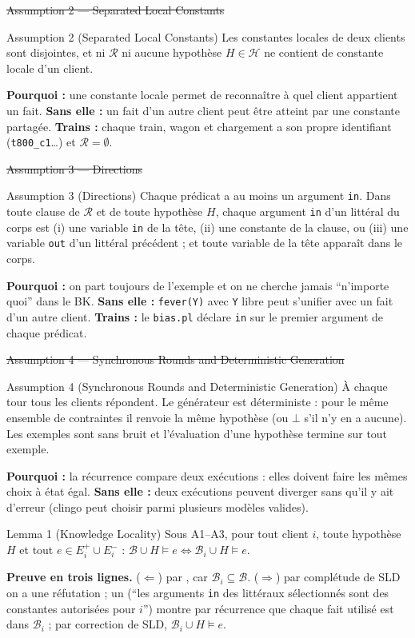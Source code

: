 \documentclass[10pt]{article}
\begin{document}
\st{Assumption 2 --- Separated Local Constants}
\begin{enonce}{Assumption 2 (Separated Local Constants)}
Les constantes locales de deux clients sont disjointes, et ni $\mathcal{R}$ ni aucune hypothèse $H\in\mathcal{H}$ ne contient de constante locale d'un client.
\end{enonce}
\textbf{Pourquoi :} une constante locale permet de reconnaître à quel client appartient un fait. \textbf{Sans elle :} un fait d'un autre client peut être atteint par une constante partagée.
\textbf{Trains :} chaque train, wagon et chargement a son propre identifiant (\texttt{t800\_c1}\ldots) et $\mathcal{R}=\emptyset$.

\st{Assumption 3 --- Directions}
\begin{enonce}{Assumption 3 (Directions)}
Chaque prédicat a au moins un argument \texttt{in}. Dans toute clause de $\mathcal{R}$ et de toute hypothèse $H$, chaque argument \texttt{in}
d'un littéral du corps est (i) une variable \texttt{in} de la tête, (ii) une constante de la clause, ou (iii) une variable \texttt{out} d'un
littéral précédent ; et toute variable de la tête apparaît dans le corps.
\end{enonce}
\textbf{Pourquoi :} on part toujours de l'exemple et on ne cherche jamais ``n'importe quoi'' dans le BK.
\textbf{Sans elle :} \texttt{fever(Y)} avec \texttt{Y} libre peut s'unifier avec un fait d'un autre client.
\textbf{Trains :} le \texttt{bias.pl} déclare \texttt{in} sur le premier argument de chaque prédicat.

\st{Assumption 4 --- Synchronous Rounds and Deterministic Generation}
\begin{enonce}{Assumption 4 (Synchronous Rounds and Deterministic Generation)}
À chaque tour tous les clients répondent. Le générateur est déterministe : pour le même ensemble de contraintes il renvoie la même hypothèse
(ou $\bot$ s'il n'y en a aucune). Les exemples sont sans bruit et l'évaluation d'une hypothèse termine sur tout exemple.
\end{enonce}
\textbf{Pourquoi :} la récurrence compare deux exécutions : elles doivent faire les mêmes choix à état égal.
\textbf{Sans elle :} deux exécutions peuvent diverger sans qu'il y ait d'erreur (clingo peut choisir parmi plusieurs modèles valides).

\begin{enonce}{Lemma 1 (Knowledge Locality)}
Sous A1--A3, pour tout client $i$, toute hypothèse $H$ et tout $e\in E_i^+\cup E_i^-$ :
$\mathcal{B}\cup H\models e\iff\mathcal{B}_i\cup H\models e$.
\end{enonce}
\textbf{Preuve en trois lignes.} ($\Leftarrow$) par , car $\mathcal{B}_i\subseteq\mathcal{B}$.
($\Rightarrow$) par complétude de SLD on a une réfutation ; un  (``les arguments \texttt{in} des littéraux sélectionnés sont des constantes autorisées pour $i$'')
montre par récurrence que chaque fait utilisé est dans $\mathcal{B}_i$ ; par correction de SLD, $\mathcal{B}_i\cup H\models e$.
\end{document}
